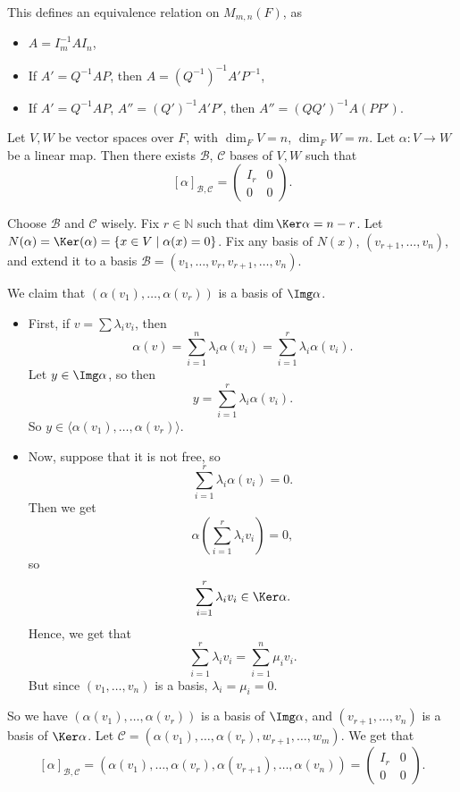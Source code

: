 \documentclass[12pt]{article}
\begin{document}
\begin{remark}
	This defines an equivalence relation on $M_{m, n}(F)$, as
	\begin{itemize}
		\item $A = I_m^{-1}AI_n$,
		\item If $A' = Q^{-1}AP$, then $A = (Q^{-1})^{-1}A' P^{-1}$,
		\item If $A' = Q^{-1}AP$, $A'' = (Q')^{-1}A'P'$, then $A'' = (QQ')^{-1}A(PP')$.
	\end{itemize}
	
\end{remark}

\begin{proposition}
	Let $V, W$ be vector spaces over $F$, with $\dim_F V = n$, $\dim_F W = m$. Let $\alpha : V \to W$ be a linear map. Then there exists $\mathcal{B}$, $\mathcal{C}$ bases of $V, W$ such that
	\[
		[\alpha]_{\mathcal{B}, \mathcal{C}} =
		\begin{pmatrix}
			I_r & 0 \\
			0 & 0
		\end{pmatrix}
	.\]
\end{proposition}

\begin{proofbox}
	Choose $\mathcal{B}$ and $\mathcal{C}$ wisely. Fix $r \in \mathbb{N}$ such that $\dim \Ker \alpha = n - r$. Let $N(\alpha) = \Ker(\alpha) = \{x \in V \mid \alpha(x) = 0\}$. Fix any basis of $N(x)$, $(v_{r+1}, \ldots, v_n)$, and extend it to a basis $\mathcal{B} = (v_1, \ldots, v_r, v_{r+1}, \ldots, v_n)$.

	We claim that $(\alpha(v_1), \ldots, \alpha(v_r))$ is a basis of $\Img \alpha$.
	\begin{itemize}
		\item First, if $v = \sum \lambda_i v_i$, then
			\[
				\alpha(v) = \sum_{i = 1}^{n} \lambda_i \alpha(v_i) = \sum_{i = 1}^{r} \lambda_i \alpha(v_i)
			.\]
			Let $y \in \Img \alpha$, so then
			\[
				y = \sum_{i = 1}^{r} \lambda_i \alpha(v_i)
			.\]
			So $y \in \langle \alpha(v_1), \ldots, \alpha(v_r)\rangle$.
		\item Now, suppose that it is not free, so
			\[
				\sum_{i = 1}^{r} \lambda_i \alpha(v_i) = 0
			.\]
			Then we get
			\[
				\alpha\left( \sum_{i = 1}^{r} \lambda_i v_i \right) = 0
			,\]
			so
			\[
			\sum_{i = 1}^{r} \lambda_i v_i \in \Ker \alpha
			.\]
			Hence, we get that
			\[
			\sum_{i = 1}^{r} \lambda_i v_i = \sum_{i = 1}^{n} \mu_i v_i
			.\]
			But since $(v_1, \ldots, v_n)$ is a basis, $\lambda_i = \mu_i = 0$.
	\end{itemize}
	So we have $(\alpha(v_1), \ldots, \alpha(v_r))$ is a basis of $\Img \alpha$, and $(v_{r+1}, \ldots, v_{n})$ is a basis of $\Ker \alpha$. Let $\mathcal{C} = (\alpha(v_1), \ldots, \alpha(v_r), w_{r+1}, \ldots, w_{m})$. We get that
	\[
		[\alpha]_{\mathcal{B}, \mathcal{C}} = (\alpha(v_1), \ldots, \alpha(v_r), \alpha(v_{r+1}), \ldots, \alpha(v_n)) =
		\begin{pmatrix}
			I_r & 0 \\
			0 & 0
		\end{pmatrix}	
	.\]
\end{proofbox}
\end{document}
